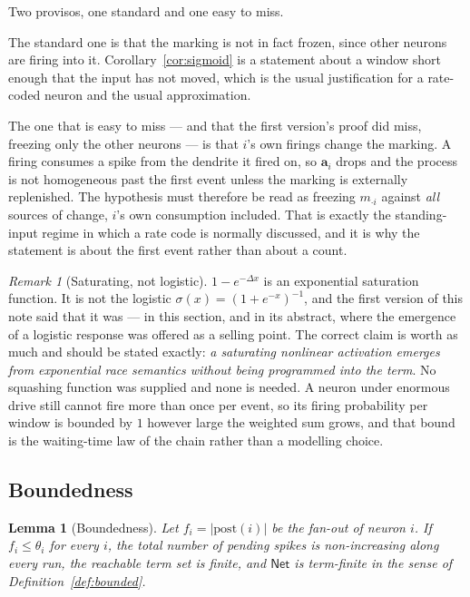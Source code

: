 \documentclass[11pt,a4paper]{article}
\theoremstyle{plain}
\newtheorem{lemma}[theorem]{Lemma}
\theoremstyle{definition}
\theoremstyle{remark}
\newtheorem{remark}[theorem]{Remark}
\newcommand{\prop}{\mathbf{a}}
\begin{document}
Two provisos, one standard and one easy to miss.

The standard one is that the marking is not in fact frozen, since other neurons are firing into it.
Corollary~\ref{cor:sigmoid} is a statement about a window short enough that the input has not moved,
which is the usual justification for a rate-coded neuron and the usual approximation.

The one that is easy to miss --- and that the first version's proof did miss, freezing only the other
neurons --- is that $i$'s own firings change the marking. A firing consumes a spike from the dendrite
it fired on, so $\prop_i$ drops and the process is not homogeneous past the first event unless the
marking is externally replenished. The hypothesis must therefore be read as freezing $m_{\cdot i}$
against \emph{all} sources of change, $i$'s own consumption included. That is exactly the
standing-input regime in which a rate code is normally discussed, and it is why the statement is
about the first event rather than about a count.

\begin{remark}[Saturating, not logistic]
\label{rem:not-logistic}
$1 - e^{-\Delta x}$ is an exponential saturation function. It is not the logistic
$\sigma(x) = (1+e^{-x})^{-1}$, and the first version of this note said that it was --- in this
section, and in its abstract, where the emergence of a logistic response was offered as a selling
point. The correct claim is worth as much and should be stated exactly: \emph{a saturating nonlinear
activation emerges from exponential race semantics without being programmed into the term}. No
squashing function was supplied and none is needed. A neuron under enormous drive still cannot fire
more than once per event, so its firing probability per window is bounded by $1$ however large the
weighted sum grows, and that bound is the waiting-time law of the chain rather than a modelling
choice.
\end{remark}

\subsection{Boundedness}
\label{sec:rnn-bounded}

\begin{lemma}[Boundedness]
\label{lem:bounded}
Let $f_i = |\mathrm{post}(i)|$ be the fan-out of neuron $i$. If $f_i \leq \theta_i$ for every $i$,
the total number of pending spikes is non-increasing along every run, the reachable term set is
finite, and $\mathsf{Net}$ is term-finite in the sense of Definition~\ref{def:bounded}.
\end{lemma}
\end{document}
